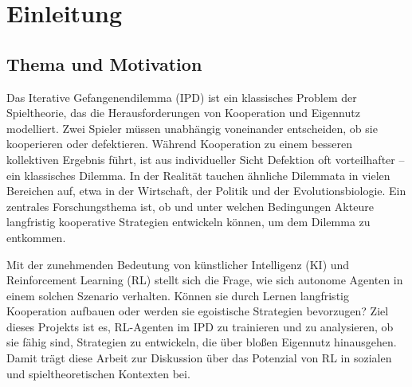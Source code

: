 \chapter{Einleitung}

\section{Thema und Motivation}
Das Iterative Gefangenendilemma (IPD) ist ein klassisches Problem der Spieltheorie, 
das die Herausforderungen von Kooperation und Eigennutz modelliert. 
Zwei Spieler müssen unabhängig voneinander entscheiden, ob sie kooperieren oder 
defektieren. Während Kooperation zu einem besseren kollektiven Ergebnis führt, 
ist aus individueller Sicht Defektion oft vorteilhafter – ein klassisches Dilemma.
In der Realität tauchen ähnliche Dilemmata in vielen Bereichen auf, etwa in der 
Wirtschaft, der Politik und der Evolutionsbiologie. Ein zentrales Forschungsthema 
ist, ob und unter welchen Bedingungen Akteure langfristig kooperative Strategien 
entwickeln können, um dem Dilemma zu entkommen.

Mit der zunehmenden Bedeutung von künstlicher Intelligenz (KI) und Reinforcement 
Learning (RL) stellt sich die Frage, wie sich autonome Agenten in einem solchen 
Szenario verhalten. Können sie durch Lernen langfristig Kooperation aufbauen 
oder werden sie egoistische Strategien bevorzugen? Ziel dieses Projekts ist es, 
RL-Agenten im IPD zu trainieren und zu analysieren, ob sie fähig sind, Strategien 
zu entwickeln, die über bloßen Eigennutz hinausgehen. Damit trägt diese Arbeit zur 
Diskussion über das Potenzial von RL in sozialen und spieltheoretischen Kontexten 
bei.

